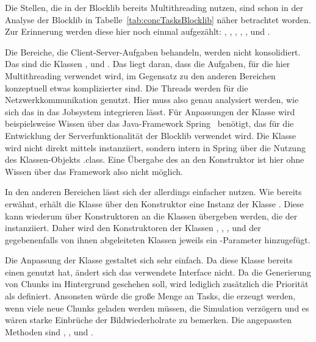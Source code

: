 Die Stellen, die in der Blocklib bereits Multithreading nutzen, sind schon in der Analyse der Blocklib in Tabelle~\ref{tab:concTasksBlocklib} näher betrachtet worden. Zur Erinnerung werden diese hier noch einmal aufgezählt: \classChunkStorage{}, \classEventManager{}, \classConnectionInfo{}, \classNioClientNetworkLayer{}, \classNioServerNetworkLayer{}, \classFluid{} und \classAudioManager{}.

Die Bereiche, die Client-Server-Aufgaben behandeln, werden nicht konsolidiert. Das sind die Klassen \classConnectionInfo{}, \classNioClientNetworkLayer{} und \classNioServerNetworkLayer{}. Das liegt daran, dass die Aufgaben, für die hier Multithreading verwendet wird, im Gegensatz zu den anderen Bereichen konzeptuell etwas komplizierter sind. Die Threads werden für die Netzwerkkommunikation genutzt. Hier muss also genau analysiert werden, wie sich das in das Jobsystem integrieren lässt. Für Anpassungen der Klasse \classConnectionInfo{} wird beispielsweise Wissen über das Java-Framework Spring~\cite{VMware2022} benötigt, das für die Entwicklung der Serverfunktionalität der Blocklib verwendet wird. Die Klasse wird nicht direkt mittels  instanziiert, sondern intern in Spring über die Nutzung des Klassen-Objekts \classConnectionInfo.class{}. Eine Übergabe des \classBlocklibExecutor{} an den Konstruktor ist hier ohne Wissen über das Framework also nicht möglich.

In den anderen Bereichen lässt sich der \classBlocklibExecutorService{} allerdings einfacher nutzen. Wie bereits erwähnt, erhält die Klasse \classContext{} über den Konstruktor eine Instanz der Klasse \classBlocklibExecutor{}. Diese kann wiederum über Konstruktoren an die Klassen übergeben werden, die der \classContext{} instanziiert. Daher wird den Konstruktoren der Klassen \classChunkStorage{}, \classEventManager{}, \classFluidManager{}, \classAudioManager{} und der gegebenenfalls von ihnen abgeleiteten Klassen jeweils ein \classBlocklibExecutorService{}-Parameter hinzugefügt.

Die Anpassung der Klasse \classChunkStorage{} gestaltet sich sehr einfach. Da diese Klasse bereits einen \classExecutor{} genutzt hat, ändert sich das verwendete Interface nicht. Da die Generierung von Chunks im Hintergrund geschehen soll, wird lediglich zusätzlich die Priorität als  definiert. Ansonsten würde die große Menge an Tasks, die erzeugt werden, wenn viele neue Chunks geladen werden müssen, die Simulation verzögern und es wären starke Einbrüche der Bildwiederholrate zu bemerken. Die angepassten Methoden sind	, ,  und .

